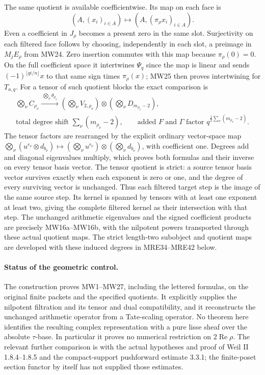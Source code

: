 The same quotient is available coefficientwise. Its map on each face is
\[
 (A,(x_i)_{i\in A})\longmapsto(A,(\pi_\rho x_i)_{i\in A}).
\]
Even a coefficient in \(J_\rho\)
becomes a present zero in the same slot. Surjectivity on each
filtered face follows by choosing, independently in each slot,
a preimage in \(M_jE_\rho\) from MW24. Zero insertion commutes with
this map because \(\pi_\rho(0)=0\). On the full coefficient space
it intertwines \(\Psi_q\) since the map is linear and sends
\((-1)^{\lfloor qi/n\rfloor}x\) to that same sign times
\(\pi_\rho(x)\); MW25 then proves intertwining for \(T_{a,q}\).
For a tensor of such quotient blocks the exact comparison is
\[
 \begin{gathered}
 \bigotimes_\nu C_{\rho_\nu}
 \xrightarrow{\ \bigotimes_\nu\theta_{\rho_\nu}\ }
 \left(\bigotimes_\nu V_{2,\rho_\nu}\right)
                         \otimes\left(\bigotimes_\nu D_{m_{\rho_\nu}-2}\right),\\
 \text{total degree shift }\sum_\nu(m_{\rho_\nu}-2),\qquad
 \text{added }F\text{ and }\Gamma\text{ factor }
                      q^{\frac12\sum_\nu(m_{\rho_\nu}-2)}.
 \end{gathered}
 \tag{MW27}
\]
The tensor factors are rearranged by the explicit ordinary vector-space
map \(\bigotimes_\nu(u^{r_\nu}\otimes d_{b_\nu})\mapsto
(\bigotimes_\nu u^{r_\nu})\otimes(\bigotimes_\nu d_{b_\nu})\),
with coefficient one. Degrees add and diagonal eigenvalues multiply,
which proves both formulas and their inverse on every tensor basis
vector. The tensor quotient is strict: a source tensor basis vector
survives exactly when each exponent is zero or one, and the degree
of every surviving vector is unchanged. Thus each filtered target
step is the image of the same source step. Its kernel is spanned
by tensors with at least one exponent at least two, giving the
complete filtered kernel as their intersection with that step.
The unchanged arithmetic eigenvalues and the signed coefficient
products are precisely MW16a--MW16b, with the nilpotent powers
transported through these actual quotient maps. The strict
length-two subobject and quotient maps are developed with these
induced degrees in MRE34--MRE42 below.

\paragraph{Status of the geometric control.}
The construction proves MW1--MW27, including the lettered formulas,
on the original finite packets and the specified quotients.
It explicitly supplies the nilpotent filtration and its tensor
and dual compatibility, and it reconstructs the unchanged arithmetic
operator from a Tate-scaling operator. No theorem here identifies
the resulting complex representation with a pure lisse sheaf over
the absolute \(\tau\)-base. In particular it proves no numerical
restriction on \(2\operatorname{Re}\rho\). The relevant further
comparison is with the actual hypotheses and proof of Weil II
1.8.4--1.8.5 and the compact-support pushforward estimate 3.3.1;
the finite-poset section functor by itself has not supplied those
estimates.

